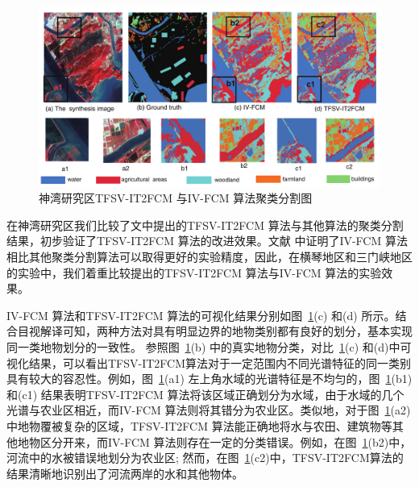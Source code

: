 \begin{figure}[htb]
    \centering
    \includegraphics[width=1.0\textwidth]{figures/hengqin}
    \caption{神湾研究区TFSV-IT2FCM 与IV-FCM 算法聚类分割图 }\label{fig:hengqin}
\end{figure}

在神湾研究区我们比较了文中提出的TFSV-IT2FCM 算法与其他算法的聚类分割结果，初步验证了TFSV-IT2FCM 算法的改进效果。文献\cite{he2016remote} 中证明了IV-FCM 算法相比其他聚类分割算法可以取得更好的实验精度，因此，在横琴地区和三门峡地区的实验中，我们着重比较提出的TFSV-IT2FCM 算法与IV-FCM 算法的实验效果。

IV-FCM 算法和TFSV-IT2FCM 算法的可视化结果分别如图~\ref{fig:hengqin}(c) 和(d) 所示。结合目视解译可知，两种方法对具有明显边界的地物类别都有良好的划分，基本实现同一类地物划分的一致性。 参照图~\ref{fig:hengqin}(b) 中的真实地物分类，对比~\ref{fig:hengqin}(c) 和(d)中可视化结果，可以看出TFSV-IT2FCM算法对于一定范围内不同光谱特征的同一类别具有较大的容忍性。例如，图~\ref{fig:hengqin}(a1) 左上角水域的光谱特征是不均匀的，图~\ref{fig:hengqin}(b1) 和(c1) 结果表明TFSV-IT2FCM 算法将该区域正确划分为水域，由于水域的几个光谱与农业区相近，而IV-FCM 算法则将其错分为农业区。类似地，对于图~\ref{fig:hengqin}(a2)中地物覆被复杂的区域，TFSV-IT2FCM 算法能正确地将水与农田、建筑物等其他地物区分开来，而IV-FCM 算法则存在一定的分类错误。例如，在图~\ref{fig:hengqin}(b2)中，河流中的水被错误地划分为农业区; 然而，在图~\ref{fig:hengqin}(c2)中，TFSV-IT2FCM算法的结果清晰地识别出了河流两岸的水和其他物体。


